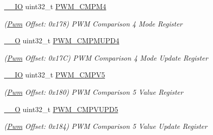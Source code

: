 \begin{DoxyCompactItemize}
\mbox{\label{structPwm_ae10da66bd6d902c4da99670f507302cc}} 
\mbox{\hyperlink{core__cm7_8h_aec43007d9998a0a0e01faede4133d6be}{\+\_\+\+\_\+\+IO}} uint32\+\_\+t \mbox{\hyperlink{structPwm_ae10da66bd6d902c4da99670f507302cc}{P\+W\+M\+\_\+\+C\+M\+P\+M4}}
\begin{DoxyCompactList}\small\item\em (\mbox{\hyperlink{structPwm}{Pwm}} Offset\+: 0x178) P\+WM Comparison 4 Mode Register \end{DoxyCompactList}\item 
\mbox{\label{structPwm_a8d3ac8e0ca521e57093b35159a551867}} 
\mbox{\hyperlink{core__cm7_8h_a7e25d9380f9ef903923964322e71f2f6}{\+\_\+\+\_\+O}} uint32\+\_\+t \mbox{\hyperlink{structPwm_a8d3ac8e0ca521e57093b35159a551867}{P\+W\+M\+\_\+\+C\+M\+P\+M\+U\+P\+D4}}
\begin{DoxyCompactList}\small\item\em (\mbox{\hyperlink{structPwm}{Pwm}} Offset\+: 0x17C) P\+WM Comparison 4 Mode Update Register \end{DoxyCompactList}\item 
\mbox{\label{structPwm_a98177d560ce0701c72542572a8d0149f}} 
\mbox{\hyperlink{core__cm7_8h_aec43007d9998a0a0e01faede4133d6be}{\+\_\+\+\_\+\+IO}} uint32\+\_\+t \mbox{\hyperlink{structPwm_a98177d560ce0701c72542572a8d0149f}{P\+W\+M\+\_\+\+C\+M\+P\+V5}}
\begin{DoxyCompactList}\small\item\em (\mbox{\hyperlink{structPwm}{Pwm}} Offset\+: 0x180) P\+WM Comparison 5 Value Register \end{DoxyCompactList}\item 
\mbox{\label{structPwm_afad6367d624b793ef5103edeafd38d43}} 
\mbox{\hyperlink{core__cm7_8h_a7e25d9380f9ef903923964322e71f2f6}{\+\_\+\+\_\+O}} uint32\+\_\+t \mbox{\hyperlink{structPwm_afad6367d624b793ef5103edeafd38d43}{P\+W\+M\+\_\+\+C\+M\+P\+V\+U\+P\+D5}}
\begin{DoxyCompactList}\small\item\em (\mbox{\hyperlink{structPwm}{Pwm}} Offset\+: 0x184) P\+WM Comparison 5 Value Update Register \end{DoxyCompactList}\item 
\mbox{\label{structPwm_abf5833cc7229cd2b49a9cd344f94cb20}} 

\end{DoxyCompactItemize}
